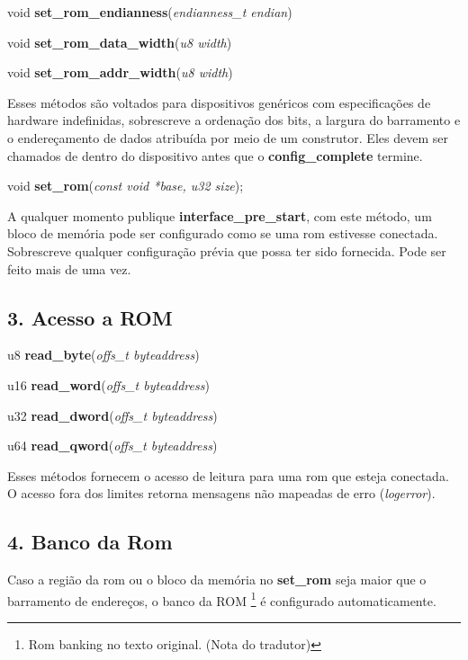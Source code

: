\documentclass[letterpaper,10pt,brazil]{sphinxmanual}
\begin{document}
\begin{DUlineblock}{0em}
\item[] void \textbf{set\_rom\_endianness}(\emph{endianness\_t endian})
\item[] void \textbf{set\_rom\_data\_width}(\emph{u8 width})
\item[] void \textbf{set\_rom\_addr\_width}(\emph{u8 width})
\end{DUlineblock}

Esses métodos são voltados para dispositivos genéricos com
especificações de hardware indefinidas, sobrescreve a ordenação dos
bits, a largura do barramento e o endereçamento de dados atribuída por
meio de um construtor. Eles devem ser chamados de dentro do dispositivo
antes que o \textbf{config\_complete} termine.

\begin{DUlineblock}{0em}
\item[] void \textbf{set\_rom}(\emph{const void *base, u32 size});
\end{DUlineblock}

A qualquer momento publique \textbf{interface\_pre\_start}, com este método,
um bloco de memória pode ser configurado como se uma rom estivesse
conectada. Sobrescreve qualquer configuração prévia que possa ter sido
fornecida. Pode ser feito mais de uma vez.


\subsection{3. Acesso a ROM}
\label{techspecs/device_rom_interface:acesso-a-rom}
\begin{DUlineblock}{0em}
\item[] u8 \textbf{read\_byte}(\emph{offs\_t byteaddress})
\item[] u16 \textbf{read\_word}(\emph{offs\_t byteaddress})
\item[] u32 \textbf{read\_dword}(\emph{offs\_t byteaddress})
\item[] u64 \textbf{read\_qword}(\emph{offs\_t byteaddress})
\end{DUlineblock}

Esses métodos fornecem o acesso de leitura para uma rom que esteja
conectada. O acesso fora dos limites retorna mensagens não mapeadas de
erro (\emph{logerror}).


\subsection{4. Banco da Rom}
\label{techspecs/device_rom_interface:banco-da-rom}
Caso a região da rom ou o bloco da memória no \textbf{set\_rom} seja maior
que o barramento de endereços, o banco da ROM \footnote[2]{\sphinxAtStartFootnote%
Rom banking no texto original. (Nota do tradutor)
} é configurado
automaticamente.
\end{document}
